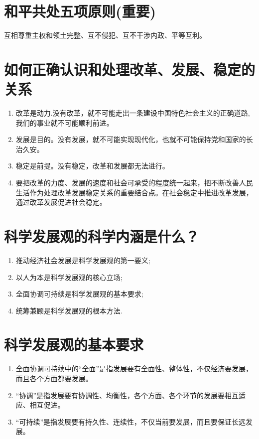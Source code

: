 \documentclass[12pt, a4paper, oneside]{ctexbook}
\begin{document}
\section{和平共处五项原则(重要)}

互相尊重主权和领土完整、互不侵犯、互不干涉内政、平等互利。

\section{如何正确认识和处理改革、发展、稳定的关系}

\begin{enumerate}
\item 改革是动力.没有改革，就不可能走出一条建设中国特色社会主义的正确道路,我们的事业就不可能顺利前进。

\item 发展是目的。没有发展，就不可能实现现代化，也就不可能保持党和国家的长治久安。

\item 稳定是前提。没有稳定，改革和发展都无法进行。

\item 要把改革的力度、发展的速度和社会可承受的程度统一起来，把不断改善人民生活作为处理改革发展稳定关系的重要结合点。在社会稳定中推进改革发展，通过改革发展促进社会稳定。
\end{enumerate}

\section{科学发展观的科学内涵是什么？}
\begin{enumerate}
\item 推动经济社会发展是科学发展观的第一要义;
\item 以人为本是科学发展观的核心立场;
\item 全面协调可持续是科学发展观的基本要求;
\item 统筹兼顾是科学发展观的根本方法.
\end{enumerate}

\section{科学发展观的基本要求}

\begin{enumerate}
\item 全面协调可持续中的“全面”是指发展要有全面性、整体性，不仅经济要发展，而且各个方面都要发展。

\item “协调”是指发展要有协调性、均衡性，各个方面、各个环节的发展要相互适应、相互促进。

\item “可持续”是指发展要有持久性、连续性，不仅当前要发展，而且要保证长远发展。
\end{enumerate}
\end{document}
